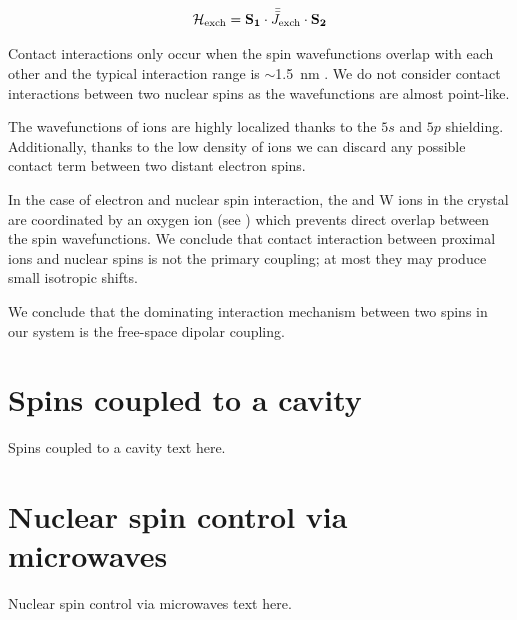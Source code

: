 \begin{equation}
    \mathcal{H}_{\text{exch}} = \mathbf{S_1} \cdot \bar{\bar {J}}_\text{exch} \cdot \mathbf{S_2}
\end{equation}

Contact interactions only occur when the spin wavefunctions overlap with each other and the typical interaction range is $\sim$1.5~nm . We do not consider contact interactions between two nuclear spins as the wavefunctions are almost point-like.

The wavefunctions of \Er ions are highly localized thanks to the $5s$ and $5p$ shielding. Additionally, thanks to the low density of \Er ions we can discard any possible contact term between two distant electron spins. 

In the case of electron and nuclear spin interaction, the \Er and W ions in the crystal are coordinated by an oxygen ion (see ) which prevents direct overlap between the spin wavefunctions. We conclude that contact interaction between proximal \Er ions and \W nuclear spins is not the primary coupling; at most they may produce small isotropic shifts.

We conclude that the dominating interaction mechanism between two spins in our system is the free-space dipolar coupling.

\chapter{Spins coupled to a cavity}

Spins coupled to a cavity text here.


\chapter{Nuclear spin control via microwaves}

Nuclear spin control via microwaves text here.